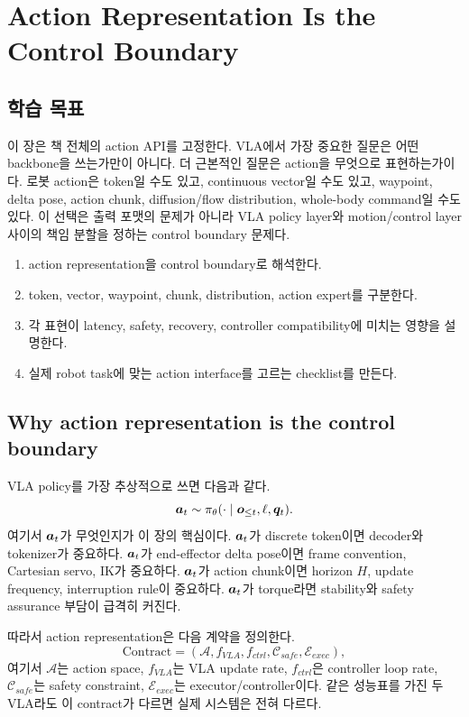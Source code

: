 \chapter{Action Representation Is the Control Boundary}

\section*{학습 목표}

이 장은 책 전체의 action API를 고정한다. VLA에서 가장 중요한 질문은 어떤 backbone을 쓰는가만이 아니다. 더 근본적인 질문은 action을 무엇으로 표현하는가이다. 로봇 action은 token일 수도 있고, continuous vector일 수도 있고, waypoint, delta pose, action chunk, diffusion/flow distribution, whole-body command일 수도 있다. 이 선택은 출력 포맷의 문제가 아니라 VLA policy layer와 motion/control layer 사이의 책임 분할을 정하는 control boundary 문제다.

\begin{enumerate}
  \item action representation을 control boundary로 해석한다.
  \item token, vector, waypoint, chunk, distribution, action expert를 구분한다.
  \item 각 표현이 latency, safety, recovery, controller compatibility에 미치는 영향을 설명한다.
  \item 실제 robot task에 맞는 action interface를 고르는 checklist를 만든다.
\end{enumerate}

\section{Why action representation is the control boundary}

VLA policy를 가장 추상적으로 쓰면 다음과 같다.
\begin{equation}
  \bm{a}_t
  \sim
  \pi_{\theta}
  (\cdot \mid \bm{o}_{\leq t},\ell,\bm{q}_t).
  \label{eq:ch13-single-action-policy}
\end{equation}
여기서 $\bm{a}_t$가 무엇인지가 이 장의 핵심이다. $\bm{a}_t$가 discrete token이면 decoder와 tokenizer가 중요하다. $\bm{a}_t$가 end-effector delta pose이면 frame convention, Cartesian servo, IK가 중요하다. $\bm{a}_t$가 action chunk이면 horizon $H$, update frequency, interruption rule이 중요하다. $\bm{a}_t$가 torque라면 stability와 safety assurance 부담이 급격히 커진다.

따라서 action representation은 다음 계약을 정의한다.
\begin{equation}
  \mathrm{Contract}
  =
  (
  \mathcal{A},
  f_{VLA},
  f_{ctrl},
  \mathcal{C}_{safe},
  \mathcal{E}_{exec}
  ),
  \label{eq:ch13-action-contract}
\end{equation}
여기서 $\mathcal{A}$는 action space, $f_{VLA}$는 VLA update rate, $f_{ctrl}$은 controller loop rate, $\mathcal{C}_{safe}$는 safety constraint, $\mathcal{E}_{exec}$는 executor/controller이다. 같은 성능표를 가진 두 VLA라도 이 contract가 다르면 실제 시스템은 전혀 다르다.

